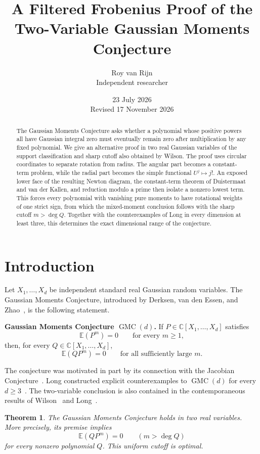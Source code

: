 \documentclass[11pt]{article}
\title{A Filtered Frobenius Proof of the\\Two-Variable Gaussian Moments Conjecture}
\author{Roy van Rijn\\{\small Independent researcher}}
\date{23 July 2026\\Revised 17 November 2026}
\newtheorem{theorem}{Theorem}[section]
\newcommand{\C}{\mathbb C}
\newcommand{\E}{\mathbb E}
\begin{document}
\maketitle

\begin{abstract}
The Gaussian Moments Conjecture asks whether a polynomial whose positive
powers all have Gaussian integral zero must eventually remain zero after
multiplication by any fixed polynomial.  We give an alternative proof in
two real Gaussian variables of the support classification and sharp
cutoff also obtained by Wilson.  The proof uses circular coordinates to separate
rotation from radius.  The angular part becomes a constant-term problem,
while the radial part becomes the simple functional \(U^j\mapsto j!\).
An exposed lower face of the resulting Newton diagram, the constant-term
theorem of Duistermaat and van der Kallen, and reduction modulo a prime then
isolate a nonzero lowest term.  This forces every polynomial with vanishing
pure moments to have rotational weights of one strict sign, from which the
mixed-moment conclusion follows with the sharp cutoff \(m>\deg Q\).
Together with the
counterexamples of Long in every dimension at least three, this determines
the exact dimensional range of the conjecture.
\end{abstract}

\section{Introduction}

Let \(X_1,\ldots,X_d\) be independent standard real Gaussian random
variables.  The Gaussian Moments Conjecture, introduced by Derksen, van den
Essen, and Zhao~\cite{DVZ}, is the following statement.

\medskip
\noindent
\textbf{Gaussian Moments Conjecture \(\operatorname{GMC}(d)\).}
If \(P\in\C[X_1,\ldots,X_d]\) satisfies
\[
  \E(P^m)=0\qquad\text{for every }m\geq 1,
\]
then, for every \(Q\in\C[X_1,\ldots,X_d]\),
\[
  \E(QP^m)=0\qquad\text{for all sufficiently large }m.
\]

\medskip
The conjecture was motivated in part by its connection with the Jacobian
Conjecture~\cite{DVZ}.  Long constructed explicit counterexamples to
\(\operatorname{GMC}(d)\) for every \(d\geq3\)~\cite{Long}.  The
two-variable conclusion is also contained in the contemporaneous results
of Wilson~\cite{Wilson} and Long~\cite{LongTorus}.

\begin{theorem}\label{thm:main}
The Gaussian Moments Conjecture holds in two real variables.  More
precisely, its premise implies
\[
  \E(QP^m)=0\qquad(m>\deg Q)
\]
for every nonzero polynomial \(Q\).  This uniform cutoff is optimal.
\end{theorem}
\end{document}
